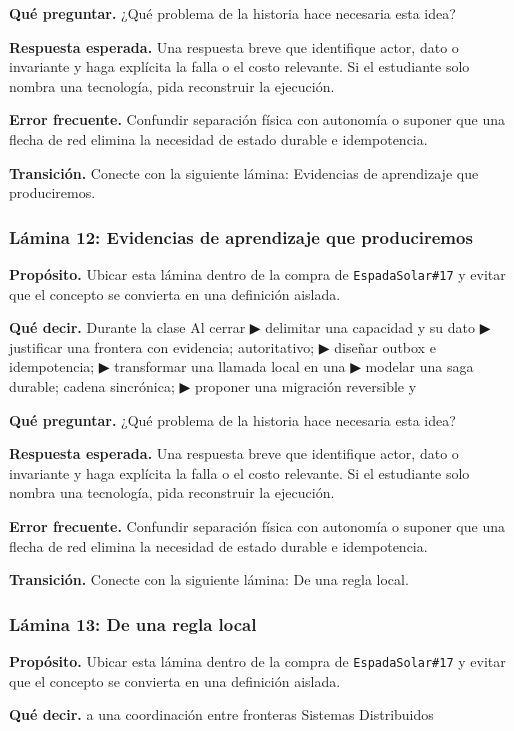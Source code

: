 \documentclass[variant=docente,cover=institutional,mode=screen]{ua-engineering-v6-article}
\begin{document}
\textbf{Qué preguntar.} ¿Qué problema de la historia hace necesaria esta idea?

\textbf{Respuesta esperada.} Una respuesta breve que identifique actor, dato o invariante y haga explícita la falla o el costo relevante. Si el estudiante solo nombra una tecnología, pida reconstruir la ejecución.

\textbf{Error frecuente.} Confundir separación física con autonomía o suponer que una flecha de red elimina la necesidad de estado durable e idempotencia.

\textbf{Transición.} Conecte con la siguiente lámina: Evidencias de aprendizaje que produciremos.

\subsubsection*{Lámina 12: Evidencias de aprendizaje que produciremos}
\textbf{Propósito.} Ubicar esta lámina dentro de la compra de \texttt{EspadaSolar\#17} y evitar que el concepto se convierta en una definición aislada.

\textbf{Qué decir.} Durante la clase Al cerrar ▶ delimitar una capacidad y su dato ▶ justificar una frontera con evidencia; autoritativo; ▶ diseñar outbox e idempotencia; ▶ transformar una llamada local en una ▶ modelar una saga durable; cadena sincrónica; ▶ proponer una migración reversible y

\textbf{Qué preguntar.} ¿Qué problema de la historia hace necesaria esta idea?

\textbf{Respuesta esperada.} Una respuesta breve que identifique actor, dato o invariante y haga explícita la falla o el costo relevante. Si el estudiante solo nombra una tecnología, pida reconstruir la ejecución.

\textbf{Error frecuente.} Confundir separación física con autonomía o suponer que una flecha de red elimina la necesidad de estado durable e idempotencia.

\textbf{Transición.} Conecte con la siguiente lámina: De una regla local.

\subsubsection*{Lámina 13: De una regla local}
\textbf{Propósito.} Ubicar esta lámina dentro de la compra de \texttt{EspadaSolar\#17} y evitar que el concepto se convierta en una definición aislada.

\textbf{Qué decir.} a una coordinación entre fronteras Sistemas Distribuidos
\end{document}
